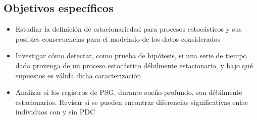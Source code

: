 \subsection{Objetivos específicos}

\begin{itemize}
\item Estudiar la definición de estacionariedad para procesos estocásticos y sus posibles 
consecuencias para el modelado de los datos considerados

\item Investigar cómo detectar, como prueba de hipótesis, si una serie de tiempo dada provenga
de un proceso estocástico débilmente estacionario, y bajo qué supuestos 
es válida dicha caracterización

\item Analizar si los registros de PSG, durante sueño profundo, son débilmente estacionarios.
Revisar si se pueden encontrar diferencias significativas entre individuos con y sin PDC
\end{itemize}

